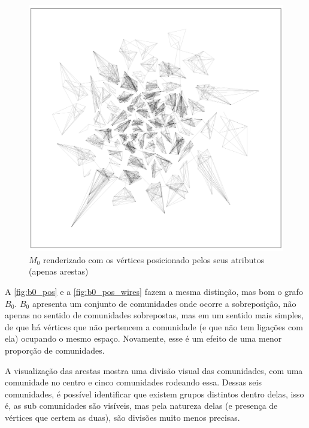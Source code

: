 \documentclass[notes.tex]{subfiles}
\begin{document}
\begin{figure}[htpb]
    \centering
    \caption{$M_0$ renderizado com os vértices posicionado pelos seus atributos (apenas arestas)}\label{fig:m0_pos_wires}
    \includegraphics[width=\textwidth, height=0.52\textheight]{figures/m0_pos_wires.png}
\end{figure}

A \autoref{fig:b0_pos} e a \autoref{fig:b0_pos_wires} fazem a mesma distinção, mas bom o grafo $B_0$.
$B_0$ apresenta um conjunto de comunidades onde ocorre a sobreposição, não apenas no sentido de comunidades sobrepostas, mas em um sentido mais simples, de que há vértices que não pertencem a comunidade (e que não tem ligações com ela) ocupando o mesmo espaço.
Novamente, esse é um efeito de uma menor proporção de comunidades.

A visualização das arestas mostra uma divisão visual das comunidades, com uma comunidade no centro e cinco comunidades rodeando essa.
Dessas seis comunidades, é possível identificar que existem grupos distintos dentro delas, isso é, as sub comunidades são visíveis, mas pela natureza delas (e presença de vértices que certem as duas), são divisões muito menos precisas.
\end{document}
